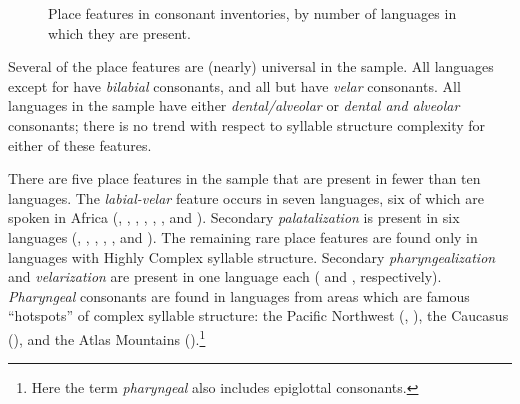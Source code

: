 \begin{figure}[t]
\caption{\label{fig:4.7}Place features in consonant inventories, by number of languages in which they are present.}
\end{figure}

  Several of the place features are (nearly) universal in the sample. All languages except for  have \textit{bilabial} consonants, and all but  have \textit{velar} consonants. All languages in the sample have either \textit{dental/alveolar} or \textit{dental and alveolar} consonants; there is no trend with respect to syllable structure complexity for either of these features.

  There are five place features in the sample that are present in fewer than ten languages. The \textit{labial-velar} feature occurs in seven languages, six of which are spoken in Africa (, , , , , , and ). Secondary \textit{palatalization} is present in six languages (, , , , , and ). The remaining rare place features are found only in languages with Highly Complex syllable structure. Secondary \textit{pharyngealization} and \textit{velarization} are present in one language each ( and , respectively). \textit{Pharyngeal} consonants are found in languages from areas which are famous ``hotspots'' of complex syllable structure: the Pacific Northwest (, ), the Caucasus (), and the Atlas Mountains ().\footnote{{Here the term} \textrm{\textit{pharyngeal} }\textrm{also includes epiglottal consonants.}}

